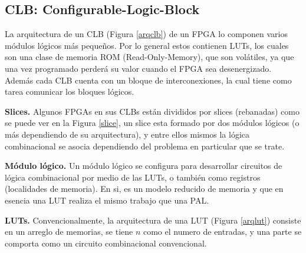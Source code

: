 \documentclass[twoside,spanish,ESP,MSc]{plantillaLabUPV}
\theoremstyle{definition}
\newcommand{\f}{FPGA }
\newcommand{\fs}{FPGAs }
\begin{document}
\subsection*{CLB: Configurable-Logic-Block}

La arquitectura de un CLB (Figura \ref{arqclb}) de un \f lo componen varios módulos lógicos más pequeños. Por lo general estos contienen LUTs, los cuales son una clase de memoria ROM (Read-Only-Memory), que son volátiles, ya que una vez programado perderá su valor cuando el \f sea desenergizado. Además cada CLB cuenta con un bloque de interconexiones, la cual tiene como tarea comunicar los bloques lógicos.



\checkmark\textbf{Slices.} Algunos \fs en sus CLBs están divididos por slices (rebanadas) como se puede ver en la Figura \ref{slice}, un slice esta formado por dos módulos lógicos (o más dependiendo de su arquitectura), y entre ellos mismos la lógica combinacional se asocia dependiendo del problema en particular que se trate.



\checkmark\textbf{Módulo lógico.} Un módulo lógico se configura para desarrollar circuitos de lógica combinacional por medio de las LUTs, o también como registros (localidades de memoria). En si, es un modelo reducido de memoria  y que en esencia una LUT realiza el mismo trabajo que una PAL.


\checkmark\textbf{LUTs.} Convencionalmente, la arquitectura de una LUT (Figura \ref{arqlut}) consiste en un arreglo de memorias, se tiene $n$ como el numero de entradas, y una parte se comporta como un circuito combinacional convencional.

\end{document}
